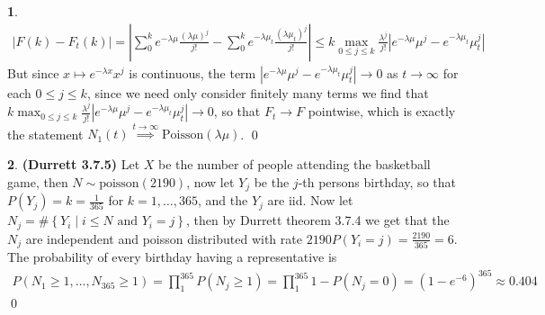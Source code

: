 \documentclass{article}
\theoremstyle{definition}
\newtheorem{pb}{}
\newcommand{\set}[1]{\left\{#1\right\}}
\newcommand{\abs}[1]{\left\vert#1\right\vert}
\newcommand{\tand}{\text{ and }}
\begin{document}
\begin{pb}
        \begin{align*}
            \abs{F(k) - F_t(k)} = \abs{\sum_0^k e^{-\lambda\mu}\frac{(\lambda\mu)^j}{j!} - \sum_0^k e^{-\lambda\mu_t}\frac{(\lambda\mu_t)^j}{j!}} \leq k \max_{ 0 \leq j \leq k}\frac{\lambda^j}{j!}\abs{e^{-\lambda \mu}\mu^j - e^{-\lambda \mu_t}\mu_t^j}
        \end{align*}
        But since \(x \mapsto e^{-\lambda x}x^j\) is continuous, the term \(\abs{e^{-\lambda \mu}\mu^j - e^{-\lambda \mu_t}\mu_t^j} \to 0\) as \(t \to \infty\) for each \(0 \leq j \leq k\), since we need only consider finitely many terms we find that \(k \max_{ 0 \leq j \leq k}\frac{\lambda^j}{j!}\abs{e^{-\lambda \mu}\mu^j - e^{-\lambda \mu_t}\mu_t^j} \to 0\), so that \(F_t \to F\) pointwise, which is exactly the statement \(N_1(t) \overset{t \to \infty}{\implies} \text{Poisson}(\lambda\mu)\). \qed
    \end{pb}
    \begin{pb}\textbf{(Durrett 3.7.5)}
        Let \(X\) be the number of people attending the basketball game, then \(N \sim \text{poisson}(2190)\), now let \(Y_j\) be the \(j\)-th persons birthday, so that \(P(Y_j) = k = \frac{1}{365}\) for \(k = 1,\hdots, 365\), and the \(Y_j\) are iid. Now let \(N_j = \# \set{Y_i \mid i \leq N \tand Y_i = j}\), then by Durrett theorem 3.7.4 we get that the \(N_j\) are independent and poisson distributed with rate \(2190P(Y_i = j) =  \frac{2190}{365} = 6\). The probability of every birthday having a representative is
        \begin{align*}
            P(N_1 \geq 1 , \hdots, N_{365} \geq 1) = \prod_1^{365}P(N_j \geq 1) = \prod_1^{365}1-P(N_j=0) = (1-e^{-6})^{365} \approx 0.404
        \end{align*} \qed
    \end{pb}
\end{document}
